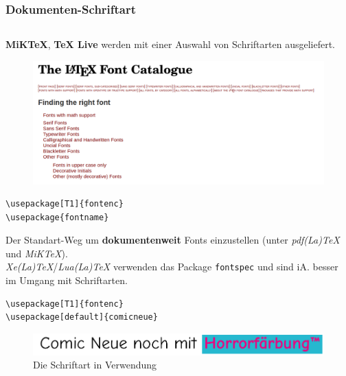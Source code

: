 \documentclass[14pt,aspectratio=169]{beamer}
\begin{document}
\begin{frame}[fragile]
    \frametitle{\insertsubsection \small\quad Dokumenten-Schriftart}
    \begin{columns}
        
        \begin{overprint}
            \textbf{MiKTeX}, \textbf{TeX Live} werden mit einer 
            Auswahl von Schriftarten ausgeliefert.
            \begin{figure}
                \includegraphics[width=.9\textwidth]{pictures/font_catalogue.png}
            \end{figure}
        
            \begin{Definition}
                \begin{verbatim}
\usepackage[T1]{fontenc}
\usepackage{fontname}
                \end{verbatim}
                
                Der Standart-Weg um \textbf{dokumentenweit} Fonts einzustellen
                (unter \textit{pdf(La)TeX} und \textit{MiKTeX}). \\[.5em]                
                \textit{Xe(La)TeX}/\textit{Lua(La)TeX} verwenden das Package
                \texttt{fontspec} und sind iA. besser im Umgang mit
                Schriftarten.
            \end{Definition}
        
            \begin{Beispiel}
                \begin{verbatim}
\usepackage[T1]{fontenc}
\usepackage[default]{comicneue}
                \end{verbatim}
                
                \begin{figure}
                    \includegraphics[width=.8\textwidth]{pictures/comicneue.pdf}
                    \caption{Die Schriftart in Verwendung}
                \end{figure}
            \end{Beispiel}
                        

\end{overprint}
\end{columns}
\end{frame}
\end{document}
